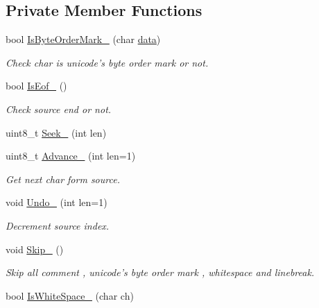 \subsection*{Private Member Functions}
\begin{DoxyCompactItemize}
\item 
bool \hyperlink{classmocha_1_1_scanner_1_1_internal_scanner_adcf5b48fc83a865cb4d92b446dc6bd81}{IsByteOrderMark\_\-} (char \hyperlink{bootstrap_8cc_a923b2158227405b9f7a6eceb6c7104c8}{data})
\begin{DoxyCompactList}\small\item\em Check char is unicode's byte order mark or not. \end{DoxyCompactList}\item 
bool \hyperlink{classmocha_1_1_scanner_1_1_internal_scanner_a7d4922d8eb9d5d36f93dcfbb1a3ce8d3}{IsEof\_\-} ()
\begin{DoxyCompactList}\small\item\em Check source end or not. \end{DoxyCompactList}\item 
uint8\_\-t \hyperlink{classmocha_1_1_scanner_1_1_internal_scanner_ad46ea002a5c9725617aeaad43160694a}{Seek\_\-} (int len)
\item 
uint8\_\-t \hyperlink{classmocha_1_1_scanner_1_1_internal_scanner_af0c25a4f10bded1e5e823b48ef51e45e}{Advance\_\-} (int len=1)
\begin{DoxyCompactList}\small\item\em Get next char form source. \end{DoxyCompactList}\item 
void \hyperlink{classmocha_1_1_scanner_1_1_internal_scanner_a1f4c5a66268a0a8bd6a4bc0a167d6e32}{Undo\_\-} (int len=1)
\begin{DoxyCompactList}\small\item\em Decrement source index. \end{DoxyCompactList}\item 
void \hyperlink{classmocha_1_1_scanner_1_1_internal_scanner_adb8625d4cf437041a792aab2f6c3e696}{Skip\_\-} ()
\begin{DoxyCompactList}\small\item\em Skip all comment , unicode's byte order mark , whitespace and linebreak. \end{DoxyCompactList}\item 
bool \hyperlink{classmocha_1_1_scanner_1_1_internal_scanner_a8f87680bcf2d5eec70554b789385c504}{IsWhiteSpace\_\-} (char ch)
\item 

\end{DoxyCompactItemize}
